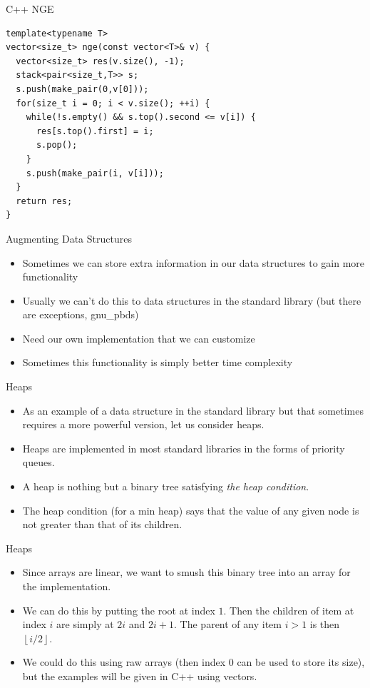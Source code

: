 \documentclass{beamer}
\newcommand\floor[1]{\left\lfloor#1\right\rfloor}
\begin{document}
\begin{frame}{C++ NGE}
    \begin{verbatim}
template<typename T>
vector<size_t> nge(const vector<T>& v) {
  vector<size_t> res(v.size(), -1);
  stack<pair<size_t,T>> s; 
  s.push(make_pair(0,v[0]));
  for(size_t i = 0; i < v.size(); ++i) {
    while(!s.empty() && s.top().second <= v[i]) {
      res[s.top().first] = i; 
      s.pop(); 
    }
    s.push(make_pair(i, v[i])); 
  }
  return res; 
}
    \end{verbatim}
\end{frame}


\begin{frame}[plain]{Augmenting Data Structures}
    \begin{itemize}
        \item Sometimes we can store extra information in our data structures to gain more functionality
        \item Usually we can't do this to data structures in the standard library (but there are exceptions, gnu\_pbds)
        \item Need our own implementation that we can customize
        \item Sometimes this functionality is simply better time complexity
    \end{itemize}
\end{frame}

\begin{frame}[plain]{Heaps}
    \begin{itemize}
        \item As an example of a data structure in the standard library but that sometimes requires a more powerful version, let us consider heaps.
        \item Heaps are implemented in most standard libraries in the forms of priority queues.
        \item A heap is nothing but a binary tree satisfying \textit{the heap condition}.
        \item The heap condition (for a min heap) says that the value of any given node is not greater than that of its children.
    \end{itemize}
\end{frame}

\begin{frame}[plain]{Heaps}
    \begin{itemize}
        \item Since arrays are linear, we want to smush this binary tree into an array for the implementation.
        \item We can do this by putting the root at index $1$. Then the children of item at index $i$ are simply at $2i$ and $2i+1$. The parent of any item $i > 1$ is then $\floor{i/2}$.
        \item We could do this using raw arrays (then index $0$ can be used to store its size), but the examples will be given in C++ using vectors.
    \end{itemize}
\end{frame}
\end{document}
